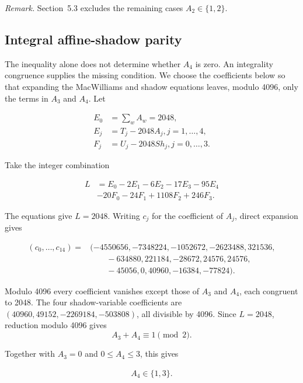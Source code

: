 \documentclass[11pt]{article}
\begin{document}
\noindent\emph{Remark.} Section~5.3 excludes the remaining cases \(A_{2}\in\{1,2\}\).

\subsection{Integral affine-shadow parity}\label{integral-affine-shadow-parity}

The inequality alone does not determine whether \(A_{4}\) is zero. An integrality congruence supplies the missing condition. We choose the coefficients below so that expanding the MacWilliams and shadow equations leaves, modulo 4096, only the terms in \(A_{3}\) and \(A_{4}\). Let

\[
\begin{aligned}
E_{0} &=\sum_{w} A_{w}=2048, \\
E_{j} &=T_{j} -2048 A_{j},                     j=1,\dots,4, \\
F_{j} &=U_{j} -2048 Sh_{j},                    j=0,\dots,3.
\end{aligned}
\]

Take the integer combination

\[
\begin{aligned}
L &=E_{0} -2E_{1} -6E_{2} -17E_{3} -95E_{4} \\
& -20F_{0} -24F_{1} +1108F_{2} +246F_{3}.
\end{aligned}
\]

The equations give \(L=2048\). Writing \(c_j\) for the coefficient of \(A_j\), direct expansion gives

\[
\begin{aligned}
(c_0,\dots,c_{14})={}&(-4550656,-7348224,-1052672,-2623488,321536,\\
&\qquad -634880,221184,-28672,24576,24576,\\
&\qquad -45056,0,40960,-16384,-77824).
\end{aligned}
\]

Modulo 4096 every coefficient vanishes except those of \(A_{3}\) and \(A_{4}\), each congruent to 2048. The four shadow-variable coefficients are \((40960, 49152, -2269184, -503808)\), all divisible by 4096. Since \(L=2048\), reduction modulo 4096 gives
\[
A_{3}+A_{4}\equiv1\pmod 2.
\]

Together with \(A_{3}=0\) and \(0 \le A_{4} \le 3\), this gives

\[
\begin{aligned}
A_{4} \in \{1,3\}.
\end{aligned}
\]
\end{document}
